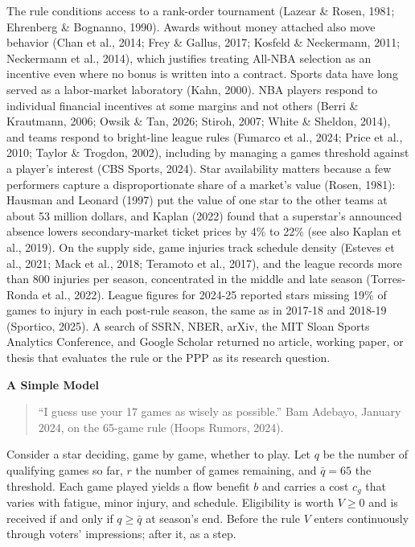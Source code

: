 \documentclass[12pt]{article}
\newcommand{\lone}[1]{\par\medskip\noindent\begin{center}\textbf{#1}\end{center}\par\nopagebreak}
\begin{document}
The rule conditions access to a rank-order tournament (Lazear \& Rosen, 1981; Ehrenberg \& Bognanno, 1990). Awards without money attached also move behavior (Chan et al., 2014; Frey \& Gallus, 2017; Kosfeld \& Neckermann, 2011; Neckermann et al., 2014), which justifies treating All-NBA selection as an incentive even where no bonus is written into a contract. Sports data have long served as a labor-market laboratory (Kahn, 2000). NBA players respond to individual financial incentives at some margins and not others (Berri \& Krautmann, 2006; Owsik \& Tan, 2026; Stiroh, 2007; White \& Sheldon, 2014), and teams respond to bright-line league rules (Fumarco et al., 2024; Price et al., 2010; Taylor \& Trogdon, 2002), including by managing a games threshold against a player's interest (CBS Sports, 2024). Star availability matters because a few performers capture a disproportionate share of a market's value (Rosen, 1981): Hausman and Leonard (1997) put the value of one star to the other teams at about 53 million dollars, and Kaplan (2022) found that a superstar's announced absence lowers secondary-market ticket prices by 4\% to 22\% (see also Kaplan et al., 2019). On the supply side, game injuries track schedule density (Esteves et al., 2021; Mack et al., 2018; Teramoto et al., 2017), and the league records more than 800 injuries per season, concentrated in the middle and late season (Torres-Ronda et al., 2022). League figures for 2024-25 reported stars missing 19\% of games to injury in each post-rule season, the same as in 2017-18 and 2018-19 (Sportico, 2025). A search of SSRN, NBER, arXiv, the MIT Sloan Sports Analytics Conference, and Google Scholar returned no article, working paper, or thesis that evaluates the rule or the PPP as its research question.


\lone{A Simple Model}


\begin{quote}\singlespacing
``I guess use your 17 games as wisely as possible.'' Bam Adebayo, January 2024, on the 65-game rule (Hoops Rumors, 2024).
\end{quote}


Consider a star deciding, game by game, whether to play. Let $q$ be the number of qualifying games so far, $r$ the number of games remaining, and $\bar q = 65$ the threshold. Each game played yields a flow benefit $b$ and carries a cost $c_g$ that varies with fatigue, minor injury, and schedule. Eligibility is worth $V \geq 0$ and is received if and only if $q \geq \bar q$ at season's end. Before the rule $V$ enters continuously through voters' impressions; after it, as a step.
\end{document}
